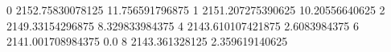 0 2152.75830078125 11.756591796875
1 2151.207275390625 10.20556640625
2 2149.33154296875 8.329833984375
4 2143.610107421875 2.6083984375
6 2141.001708984375 0.0
8 2143.361328125 2.359619140625
